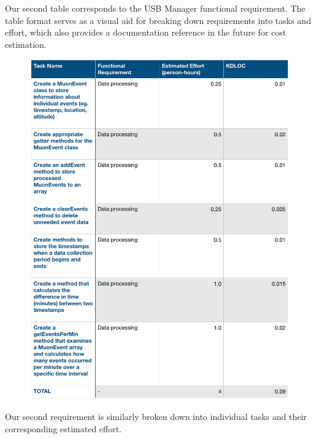 \documentclass[11pt,a4paper]{article}
\begin{document}
Our second table corresponds to the USB Manager functional requirement. The table format serves as a visual aid for breaking down requirements into tasks and effort, which also provides a documentation reference in the future for cost estimation. 

\newpage
\begin{figure}[h]
  \centering
      \includegraphics[width=1.0\textwidth]{dataproctable2.png}  
\end{figure}

Our second requirement is similarly broken down into individual tasks and their corresponding estimated effort.
\end{document}
